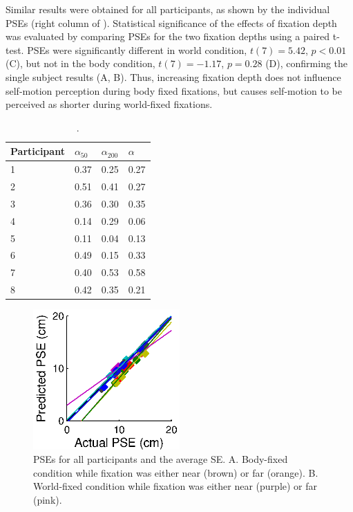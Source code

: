 Similar results were obtained for all participants, as shown by the individual PSEs (right column of ). Statistical significance of the effects of fixation depth was evaluated by comparing PSEs for the two fixation depths using a paired t-test. PSEs were significantly different in world condition, $t(7) = 5.42$, $p < 0.01$ (C), but not in the body condition, $t(7) = -1.17$, $p = 0.28$ (D), confirming the single subject results (A, B). Thus, increasing fixation depth does not influence self-motion perception during body fixed fixations, but causes self-motion to be perceived as shorter during world-fixed fixations.

\begin{table}
    \begin{tabular}{l|lll}
	Participant & $\alpha_{50}$ & $\alpha_{200}$ & $\alpha$ \\
    \hline
	1 & 0.37 & 0.25 & 0.27 \\
	2 & 0.51 & 0.41 & 0.27 \\
	3 & 0.36 & 0.30 & 0.35 \\
	4 & 0.14 & 0.29 & 0.06 \\
	5 & 0.11 & 0.04 & 0.13 \\
	6 & 0.49 & 0.15 & 0.33 \\
	7 & 0.40 & 0.53 & 0.58 \\
	8 & 0.42 & 0.35 & 0.21 \\
    \end{tabular}

    \caption{.}

    \label{p4:tab2}
\end{table}

\begin{figure}
    \includegraphics[width=0.5\textwidth]{src/paper4/paper4_figure4.eps}

	\caption{PSEs for all participants and the average \textpm SE. A.  Body-fixed condition while fixation was either near (brown) or far (orange). B. World-fixed condition while fixation was either near (purple) or far (pink).}
	\label{p4:fig4}
\end{figure}

